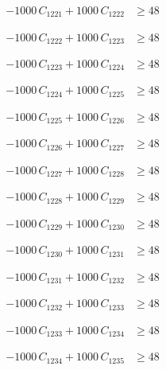 \documentclass[a4paper,11pt]{article}
\begin{document}
\begin{align}
-1000\,C_{1221} + 1000\,C_{1222} &\geq 48 \nonumber
\end{align}

\begin{align}
-1000\,C_{1222} + 1000\,C_{1223} &\geq 48 \nonumber
\end{align}

\begin{align}
-1000\,C_{1223} + 1000\,C_{1224} &\geq 48 \nonumber
\end{align}

\begin{align}
-1000\,C_{1224} + 1000\,C_{1225} &\geq 48 \nonumber
\end{align}

\begin{align}
-1000\,C_{1225} + 1000\,C_{1226} &\geq 48 \nonumber
\end{align}

\begin{align}
-1000\,C_{1226} + 1000\,C_{1227} &\geq 48 \nonumber
\end{align}

\begin{align}
-1000\,C_{1227} + 1000\,C_{1228} &\geq 48 \nonumber
\end{align}

\begin{align}
-1000\,C_{1228} + 1000\,C_{1229} &\geq 48 \nonumber
\end{align}

\begin{align}
-1000\,C_{1229} + 1000\,C_{1230} &\geq 48 \nonumber
\end{align}

\begin{align}
-1000\,C_{1230} + 1000\,C_{1231} &\geq 48 \nonumber
\end{align}

\begin{align}
-1000\,C_{1231} + 1000\,C_{1232} &\geq 48 \nonumber
\end{align}

\begin{align}
-1000\,C_{1232} + 1000\,C_{1233} &\geq 48 \nonumber
\end{align}

\begin{align}
-1000\,C_{1233} + 1000\,C_{1234} &\geq 48 \nonumber
\end{align}

\begin{align}
-1000\,C_{1234} + 1000\,C_{1235} &\geq 48 \nonumber
\end{align}
\end{document}
